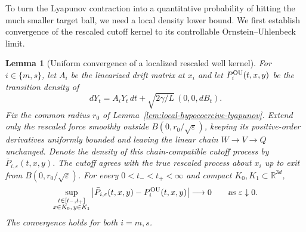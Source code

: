 \documentclass[11pt]{article}
\numberwithin{equation}{section}
\theoremstyle{plain}
\newtheorem{lemma}[theorem]{Lemma}
\theoremstyle{definition}
\theoremstyle{remark}
\newcommand{\R}{\mathbb R}
\newcommand{\eps}{\varepsilon}
\begin{document}
To turn the Lyapunov contraction into a quantitative probability
of hitting the much smaller target ball, we need a local density lower bound.
We first establish convergence of the rescaled cutoff kernel to its
controllable Ornstein--Uhlenbeck limit.

\begin{lemma}[Uniform convergence of a localized rescaled well kernel]
\label{lem:rescaled-well-kernel-convergence}
For $i\in\{m,s\}$, let $A_i$ be the linearized drift matrix at $x_i$ and let
$P_i^{\rm OU}(t,x,y)$ be the transition density of
\begin{equation}
\label{eq:well-ou-process}
dY_t=A_iY_t\,dt+\sqrt{2\gamma/L}\,(0,0,dB_t).
\end{equation}
Fix the common radius $r_0$ of
Lemma~\ref{lem:local-hypocoercive-lyapunov}.  Extend
only the rescaled force smoothly outside $B(0,r_0/\sqrt\eps)$, keeping its
positive-order derivatives uniformly bounded and leaving the linear chain
$W\to V\to Q$ unchanged.  Denote the density of this chain-compatible cutoff
process by
$\bar P_{i,\eps}(t,x,y)$.  The cutoff agrees with the true rescaled process
about $x_i$ up to
exit from $B(0,r_0/\sqrt\eps)$.
For every $0<t_-<t_+<\infty$ and compact $K_0,K_1\subset\R^{3d}$,
\[
\sup_{\substack{t\in[t_-,t_+]\\x\in K_0,\,y\in K_1}}
\left|
\bar P_{i,\eps}(t,x,y)
-P_i^{\rm OU}(t,x,y)
\right|\longrightarrow0
\qquad\text{as $\eps\downarrow0$}.
\]
The convergence holds for both $i=m,s$.
\end{lemma}
\end{document}
